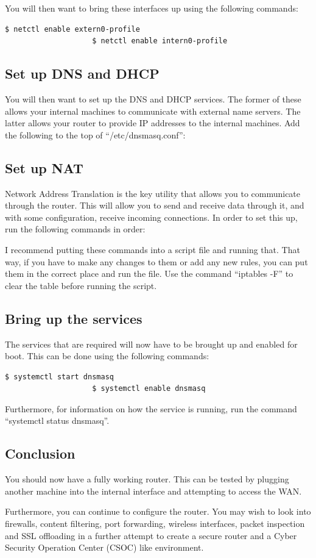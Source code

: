 				You will then want to bring these interfaces up using the following commands:
				\begin{lstlisting}[style=CLI]
					$ netctl enable extern0-profile
					$ netctl enable intern0-profile
				\end{lstlisting}

			\subsection{Set up DNS and DHCP}
				You will then want to set up the DNS and DHCP services.
				The former of these allows your internal machines to communicate with external name servers.
				The latter allows your router to provide IP addresses to the internal machines.
				Add the following to the top of ``/etc/dnsmasq.conf'':
				
			\subsection{Set up NAT}
				Network Address Translation is the key utility that allows you to communicate through the router.
				This will allow you to send and receive data through it, and with some configuration, receive incoming connections.
				In order to set this up, run the following commands in order:
				
				I recommend putting these commands into a script file and running that.
				That way, if you have to make any changes to them or add any new rules, you can put them in the correct place and run the file.
				Use the command ``iptables -F'' to clear the table before running the script.

			\subsection{Bring up the services}
				The services that are required will now have to be brought up and enabled for boot.
				This can be done using the following commands:
				\begin{lstlisting}[style=CLI]
					$ systemctl start dnsmasq
					$ systemctl enable dnsmasq
				\end{lstlisting}
				Furthermore, for information on how the service is running, run the command ``systemctl status dnsmasq''.

			\subsection{Conclusion}
				You should now have a fully working router.
				This can be tested by plugging another machine into the internal interface and attempting to access the WAN.

				Furthermore, you can continue to configure the router.
				You may wish to look into firewalls, content filtering, port forwarding, wireless interfaces, packet inspection and SSL offloading in a further attempt to create a secure router and a Cyber Security Operation Center (CSOC) like environment.


